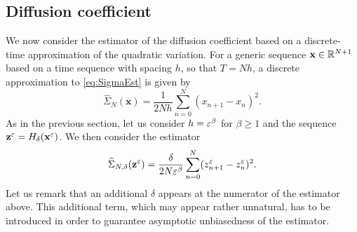 \documentclass[10pt]{article}
\begin{document}
\subsection{Diffusion coefficient}

We now consider the estimator of the diffusion coefficient based on a discrete-time approximation of the quadratic variation. For a generic sequence $\mathbf x\in \mathbb{R}^{N+1}$ based on a time sequence with spacing $h$, so that $T = Nh$, a discrete approximation to \eqref{eq:SigmaEst} is given by
\begin{equation}
	\widehat \Sigma_{N}(\mathbf x) = \frac{1}{2Nh} \sum_{n=0}^N (x_{n+1}- x_n)^2.
\end{equation}
As in the previous section, let us consider $h = \varepsilon^\beta$ for $\beta \geq 1$ and the sequence $\mathbf z^\varepsilon = H_\delta(\mathbf x^\varepsilon)$. We then consider the estimator 
\begin{equation}\label{eq:SigmaEstDiscrete}
	\widehat \Sigma_{N, \delta}(\mathbf z^\varepsilon) = \frac{\delta}{2N\varepsilon^\beta} \sum_{n=0}^N (z^\varepsilon_{n+1} - z^\varepsilon_n)^2.
\end{equation}
Let us remark that an additional $\delta$ appears at the numerator of the estimator above. This additional term, which may appear rather unnatural, has to be introduced in order to guarantee asymptotic unbiasedness of the estimator.
\end{document}
